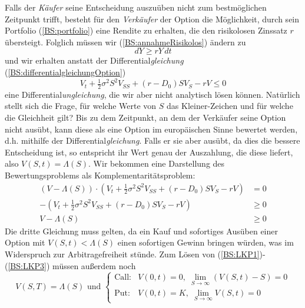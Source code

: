 Falls der {\textit{Käufer}} seine Entscheidung auszuüben nicht zum bestmöglichen Zeitpunkt trifft, besteht für den {\textit{Verkäufer}} der Option die Möglichkeit, durch sein Portfolio (\ref{BS:portfolio}) eine Rendite zu erhalten, die den risikolosen Zinssatz $r$ übersteigt. Folglich müssen wir (\ref{BS:annahmeRisikolos}) ändern zu
\begin{equation*}
dY \geq rY\,dt 
\end{equation*}
und wir erhalten anstatt der Differential{\textit{gleichung}} (\ref{BS:differentialgleichungOption})
\begin{equation}
V_t + \tfrac{1}{2}\sigma^2S^2V_{SS} + \left(r-D_0\right)SV_S - rV \leq 0 \label{BS:DUGl}
\end{equation}
eine Differential{\textit{ungleichung}}, die wir aber nicht analytisch lösen können.
Natürlich stellt sich die Frage, für welche Werte von $S$ das Kleiner-Zeichen und für welche die Gleichheit gilt? Bis zu dem Zeitpunkt, an dem der Verkäufer seine Option nicht ausübt, kann diese als eine Option im europäischen Sinne bewertet werden, d.h. mithilfe der Differential{\textit{gleichung}}. Falls er sie aber ausübt, da dies die bessere Entscheidung ist, so entspricht ihr Wert genau der Auszahlung, die diese liefert, also $V(S,t) = \Lambda(S)$. Wir bekommen eine Darstellung des Bewertungsproblems als Komplementaritätsproblem:
\begin{eqnarray}
\left(V- \Lambda(S) \right) \cdot \left( V_t + \frac{1}{2}\sigma^2S^2V_{SS} + \left(r-D_0\right)SV_S - rV \right) & =  0 \label{BS:LKP1} \\
- \left( V_t + \frac{1}{2}\sigma^2S^2V_{SS} + \left(r-D_0\right)SV_S - rV \right) & \geq  0 \label{BS:LKP2} \\
V- \Lambda(S) & \geq 0 \label{BS:LKP3}
\end{eqnarray}
Die dritte Gleichung muss gelten, da ein Kauf und sofortiges Ausüben einer Option mit $V(S,t) < \Lambda(S)$ einen sofortigen Gewinn bringen würden, was im Widerspruch zur Arbitragefreiheit stünde. Zum Lösen von (\ref{BS:LKP1})-(\ref{BS:LKP3}) müssen außerdem noch
\begin{equation} 
V(S,T) = \Lambda(S) \text{ und }
\begin{cases}
\text{Call:} & V(0,t) = 0,\; \lim\limits_{S \rightarrow \infty } {\left( V(S,t)-S\right)} = 0 \\
\text{Put:} & V(0,t) = K,\; \lim\limits_{S \rightarrow \infty }{V(S,t)} = 0  
\end{cases}
\end{equation}
